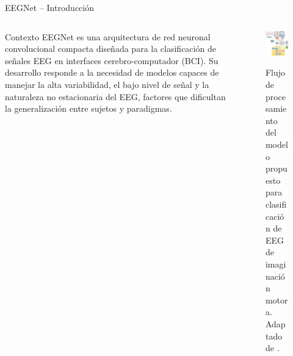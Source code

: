 \documentclass{beamer}
\begin{document}
\begin{frame}{EEGNet – Introducción}
\begin{columns}[T] %

    \begin{column}{0.55\textwidth}
        \begin{block}{Contexto}
            EEGNet es una arquitectura de red neuronal convolucional compacta 
            diseñada para la clasificación de señales EEG en interfaces 
            cerebro-computador (BCI). Su desarrollo responde a la necesidad de 
            modelos capaces de manejar la alta variabilidad, el bajo nivel de 
            señal y la naturaleza no estacionaria del EEG, factores que dificultan 
            la generalización entre sujetos y paradigmas.
        \end{block}
    \end{column}

    \begin{column}{0.45\textwidth}
        \begin{figure}
            \centering
            \href{https://www.nature.com/articles/s41598-025-00824-7/figures/1}{%
                \includegraphics[width=\linewidth]{motorimageryEEG.png}%
            }
            \caption{\small Flujo de procesamiento del modelo propuesto para clasificación de EEG de imaginación motora. Adaptado de \textcite{Mathiyazhagan2025MI}.}
            \label{fig:flujo_eeg}
        \end{figure}
    \end{column}

\end{columns}
\end{frame}
\end{document}
